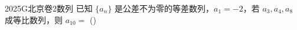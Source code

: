 
\begin{problem}{2025}{G}{北京卷}{2}{数列}
已知 $\{a_n\}$ 是公差不为零的等差数列，$a_1=-2$，若 $a_3, a_4, a_8$ 成等比数列，则 $a_{10}=$
(\hspace{1cm})
\begin{choices}
\end{choices}
\end{problem}